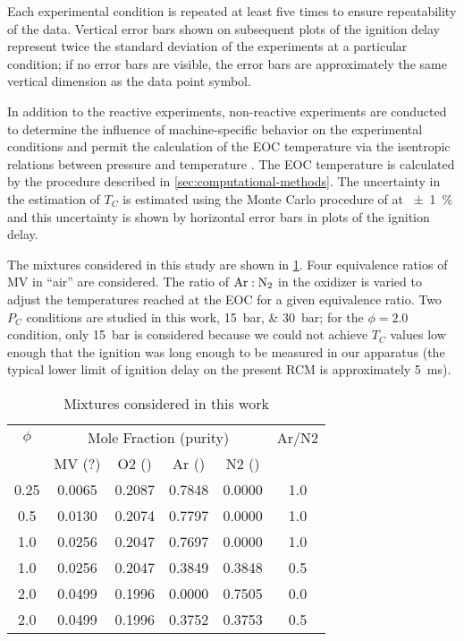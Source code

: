 \documentclass[12pt]{../ussci}
\begin{document}
Each experimental condition is repeated at least five times to ensure
repeatability of the data. Vertical error bars shown on subsequent plots of the
ignition delay represent twice the standard deviation of the experiments at a
particular condition; if no error bars are visible, the error bars are
approximately the same vertical dimension as the data point symbol.

In addition to the reactive experiments, non-reactive experiments are conducted
to determine the influence of machine-specific behavior on the experimental
conditions and permit the calculation of the EOC temperature via the isentropic
relations between pressure and temperature \autocite{Lee1998}. The EOC
temperature is calculated by the procedure described in
\cref{sec:computational-methods}. The uncertainty in the estimation of \(T_C\)
is estimated using the Monte Carlo procedure of \textcite{Weber2015} at
\SI{\pm1}{\percent} and this uncertainty is shown by horizontal error bars in
plots of the ignition delay.

The mixtures considered in this study are shown in \cref{tab:mixtures}. Four
equivalence ratios of MV in ``air'' are considered. The ratio of
\(\ce{Ar}:\ce{N2}\) in the oxidizer is varied to adjust the temperatures reached
at the EOC for a given equivalence ratio. Two \(P_C\) conditions are studied in
this work, \SIlist{15;30}{\bar}; for the \(\phi=2.0\) condition, only
\SI{15}{\bar} is considered because we could not achieve \(T_C\) values low
enough that the ignition was long enough to be measured in our apparatus (the
typical lower limit of ignition delay on the present RCM is approximately
\SI{5}{\ms}).

\begin{table}[htbp]
    \centering
    \caption{Mixtures considered in this work}
    \begin{tabular}{cccccc}
        \toprule
        \(\phi\) & \multicolumn{4}{c}{Mole Fraction (purity)} & Ar/N2 \\
        \cmidrule{2-5}
         & MV (?) & O2 () & Ar () & N2 () &  \\
        0.25 & 0.0065 & 0.2087 & 0.7848 & 0.0000 & 1.0 \\
        0.5 & 0.0130 & 0.2074 & 0.7797 & 0.0000 & 1.0 \\
        1.0 & 0.0256 & 0.2047 & 0.7697 & 0.0000 & 1.0 \\
        1.0 & 0.0256 & 0.2047 & 0.3849 & 0.3848 & 0.5 \\
        2.0 & 0.0499 & 0.1996 & 0.0000 & 0.7505 & 0.0 \\
        2.0 & 0.0499 & 0.1996 & 0.3752 & 0.3753 & 0.5 \\
        \bottomrule
    \end{tabular}
    \label{tab:mixtures}
\end{table}
\end{document}
